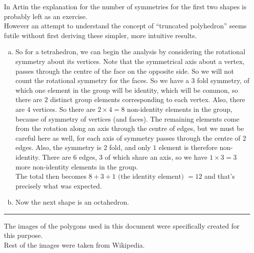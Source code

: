 \documentclass[12pt]{article}
\begin{document}
In Artin the explanation for the number of symmetries for the first two shapes is probably left as an exercise.\\
However an attempt to understand the concept of ``truncated polyhedron'' seems futile without first deriving these simpler, more intuitive results.\\
\begin{enumerate}[(a)]
\item
So for a tetrahedron, we can begin the analysis by considering the rotational symmetry about its vertices. Note that the symmetrical axis about a vertex, passes through the centre of the face on the opposite side. So we will not count the rotational symmetry for the faces. So we have a $3$ fold symmetry, of which one element in the group will be identity, which will be common, so there are $2$ distinct group elements corresponding to each vertex. Also, there are $4$ vertices. So there are $2 \times 4 = 8$ non-identity elements in the group, because of symmetry of vertices (and faces). The remaining elements come from the rotation along an axis through the centre of edges, but we must be careful here as well, for each axis of symmetry passes through the centre of 2 edges. Also, the symmetry is $2$ fold, and only $1$ element is therefore non-identity. There are $6$ edges, $3$ of which share an axis, so we have $1 \times 3 = 3$ more non-identity elements in the group.\\
The total then becomes $8 + 3 + 1 \text{ (the identity element) } = 12$ and that's precisely what was expected.
\par
\item
Now the next shape is an octahedron.\\
{\bf < incomplete > }
\end{enumerate}
\vspace{20pt}
\hrule
The images of the polygons used in this document were specifically created for this purpose.\\
Rest of the images were taken from Wikipedia.
\end{document}
